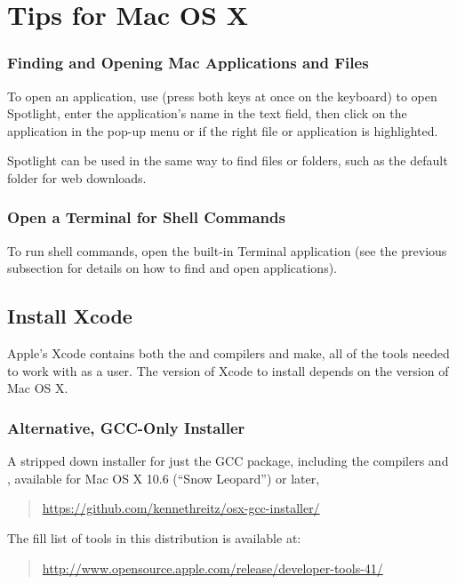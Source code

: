 \section{Tips for Mac OS X}

\subsubsection{Finding and Opening Mac Applications and Files}

To open an application, use  (press both keys at
once on the keyboard) to open Spotlight, enter the application's name
in the text field, then click on the application in the pop-up menu or
\code{[Return]} if the right file or application is highlighted.

Spotlight can be used in the same way to find files or folders,
such as the default  folder for web downloads.

\subsubsection{Open a Terminal for Shell Commands}

To run shell commands, open the built-in Terminal application (see the
previous subsection for details on how to find and open applications).

\subsection{Install Xcode}

Apple's Xcode contains both the \clang and \gpp compilers and make,
all of the tools needed to work with \CmdStan as a user.  The version
of Xcode to install depends on the version of Mac OS X.

\subsubsection{Alternative, GCC-Only Installer}

A stripped down installer for just the GCC package, including the \Cpp
compilers  and , available for Mac OS X 10.6
(``Snow Leopard'') or later,
%
\begin{quote}
\url{https://github.com/kennethreitz/osx-gcc-installer/}
\end{quote}
%
The fill list of tools in this distribution is available at:
%
\begin{quote}
\url{http://www.opensource.apple.com/release/developer-tools-41/}
\end{quote}


